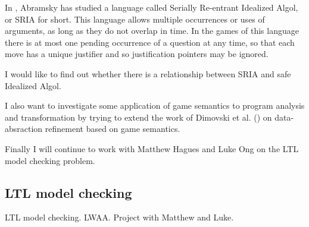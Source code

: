 In \cite{abramsky:mchecking_ia}, Abramsky has studied a language
called Serially Re-entrant Idealized Algol, or SRIA for short. This
language allows multiple occurrences or uses of arguments, as long
as they do not overlap in time. In the games of this language there
is at most one pending occurrence of a question at any time, so that
each move has a unique justifier and so justification pointers may
be ignored.

I would like to find out whether there is a relationship between
SRIA and safe Idealized Algol.


I also want to investigate some application of game semantics to
program analysis and transformation by trying to extend the work of
Dimovski et al. (\cite{DBLP:conf/sas/DimovskiGL05}) on
data-absraction refinement based on game semantics.

Finally I will continue to work with Matthew Hagues and Luke Ong on
the LTL model checking problem.


\subsection{LTL model checking}
LTL model checking. LWAA. Project with Matthew and Luke.
